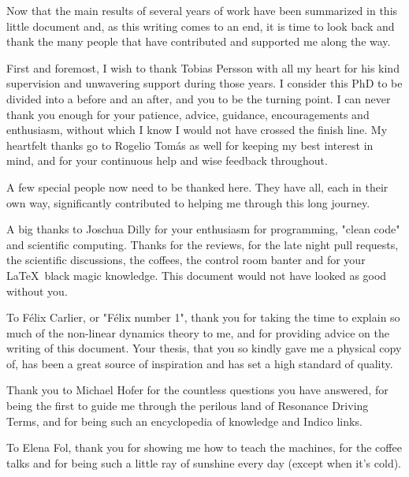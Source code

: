 \begin{acknowledgements}
\vspace{0.8cm}

Now that the main results of several years of work have been summarized in this little document and, as this writing comes to an end, it is time to look back and thank the many people that have contributed and supported me along the way.
\newline

First and foremost, I wish to thank Tobias Persson with all my heart for his kind supervision and unwavering support during those years.
I consider this PhD to be divided into a before and an after, and you to be the turning point.
I can never thank you enough for your patience, advice, guidance, encouragements and enthusiasm, without which I know I would not have crossed the finish line.
My heartfelt thanks go to Rogelio Tomás as well for keeping my best interest in mind, and for your continuous help and wise feedback throughout.
\newline

A few special people now need to be thanked here.
They have all, each in their own way, significantly contributed to helping me through this long journey.
\newline

A big thanks to Joschua Dilly for your enthusiasm for programming, "clean code" and scientific computing.
Thanks for the reviews, for the late night pull requests, the scientific discussions, the coffees, the control room banter and for your \LaTeX \ black magic knowledge.
This document would not have looked as good without you.

To Félix Carlier, or "Félix number \num{1}", thank you for taking the time to explain so much of the non-linear dynamics theory to me, and for providing advice on the writing of this document.
Your thesis, that you so kindly gave me a physical copy of, has been a great source of inspiration and has set a high standard of quality.

Thank you to Michael Hofer for the countless questions you have answered, for being the first to guide me through the perilous land of Resonance Driving Terms, and for being such an encyclopedia of knowledge and Indico links.

To Elena Fol, thank you for showing me how to teach the machines, for the coffee talks and for being such a little ray of sunshine every day (except when it's cold).


\end{acknowledgements}
